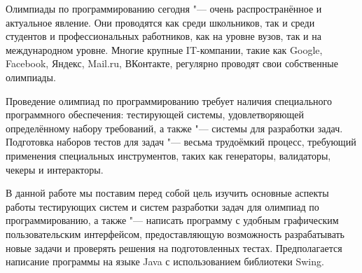 Олимпиады по программированию сегодня "--- очень распространённое и актуальное явление. Они проводятся как среди школьников, так и среди студентов и профессиональных работников, как на уровне вузов, так и на международном уровне. Многие крупные IT-компании, такие как Google, Facebook, Яндекс, Mail.ru, ВКонтакте, регулярно проводят свои собственные олимпиады.

Проведение олимпиад по программированию требует наличия специального программного обеспечения: тестирующей системы, удовлетворяющей определённому набору требований, а также "--- системы для разработки задач. Подготовка наборов тестов для задач "--- весьма трудоёмкий процесс, требующий применения специальных инструментов, таких как генераторы, валидаторы, чекеры и интеракторы.

В данной работе мы поставим перед собой цель изучить основные аспекты работы тестирующих систем и систем разработки задач для олимпиад по программированию, а также "--- написать программу с удобным графическим пользовательским интерфейсом, предоставляющую возможность разрабатывать новые задачи и проверять решения на подготовленных тестах. Предполагается написание программы на языке Java с использованием библиотеки Swing.